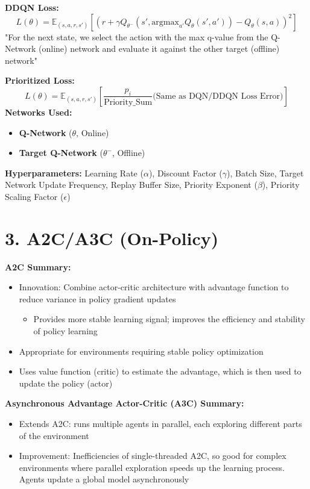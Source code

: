 \documentclass[letterpaper,10pt]{article}
\begin{document}
\begin{multicols}{2}
\noindent \textbf{DDQN Loss:}
\[
L(\theta) = \mathbb{E}_{(s, a, r, s')} \left[ \left( r + \gamma Q_{\theta^-}(s', \text{argmax}_{a'} Q_\theta(s', a')) - Q_\theta(s, a) \right)^2 \right]
\]
"For the next state, we select the action with the max q-value from the Q-Network (online) network and evaluate it against the other target (offline) network"

\noindent \textbf{Prioritized Loss:}
\[
L(\theta) = \mathbb{E}_{(s, a, r, s')} \left[ \frac{p_i}{\text{Priority\_Sum}} \text{(Same as DQN/DDQN Loss Error)} \right]
\]
\textbf{Networks Used:} 
\begin{itemize}
    \item \textbf{Q-Network} (\(\theta\), Online)
    \item \textbf{Target Q-Network} (\(\theta^-\), Offline)
\end{itemize}
\textbf{Hyperparameters: }Learning Rate (\(\alpha\)), Discount Factor (\(\gamma\)), Batch Size, Target Network Update Frequency, Replay Buffer Size, Priority Exponent (\(\beta\)), Priority Scaling Factor (\(\epsilon\))


\section*{3. A2C/A3C (On-Policy)}
\textbf{A2C Summary:}
\begin{itemize}
    \item Innovation: Combine actor-critic architecture with advantage function to reduce variance in policy gradient updates
    \begin{itemize}
        \item Provides more stable learning signal; improves the efficiency and stability of policy learning
    \end{itemize}
    \item Appropriate for environments requiring stable policy optimization
    \item Uses value function (critic) to estimate the advantage, which is then used to update the policy (actor)
\end{itemize}

\noindent \textbf{Asynchronous Advantage Actor-Critic (A3C) Summary:}
\begin{itemize}
    \item Extends A2C: runs multiple agents in parallel, each exploring different parts of the environment
    \item Improvement: Inefficiencies of single-threaded A2C, so good for complex environments where parallel exploration speeds up the learning process. Agents update a global model asynchronously
\end{itemize}


\end{multicols}
\end{document}
